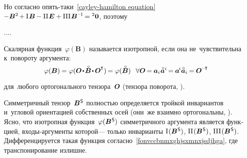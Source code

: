 \begin{otherlanguage}{russian}

Но согласно опять\hbox{-}таки~\eqref{cayley-hamilton equation}
${\hspace{-0.1ex} -\bm{B}^{2} \hspace{-0.2ex} + \mathrm{I}\hspace{.16ex} \bm{B} \hspace{-0.1ex} - \mathrm{II}\hspace{.16ex} \UnitDyad + \mathrm{III}\hspace{.16ex} \bm{B}^{\expminusone} \hspace{-0.25ex} = \zerobivalent}$,
поэтому


....


Скалярная функция~${\varphi(\bm{B})}$ называется изотропной,
если она не~чувствительна к~повороту аргумента:
\nopagebreak\vspace{.1em}\begin{equation*}
\varphi(\bm{B}) \hspace{-0.12ex} = \varphi ( \rotationtensor \narrowdotp \smash{\mathcircabove{\bm{B}}} \narrowdotp \hspace{.15ex} \rotationtensor^{\hspace{-0.1ex}\T} ) \hspace{-0.2ex} = \varphi(\smash{\mathcircabove{\bm{B}}}) \;\;\,
\forall \rotationtensor \hspace{-0.2ex} = \hspace{-0.1ex} \bm{a}_i \hspace{.1ex} \mathcircabove{\bm{a}}^i \hspace{-0.25ex} = \hspace{-0.1ex} \bm{a}^{\hspace{-0.2ex}i} \mathcircabove{\bm{a}}_i \hspace{-0.16ex} = \hspace{-0.1ex} \rotationtensor^{\hspace{-0.1ex}\expminusT}
\end{equation*}
\par\vspace{-0.25em}\noindent
для~любого ортогонального тензора~$\bm{O}$ (тензора поворота, ).

Симметричный тензор~${\bm{B}^{\mathsf{\hspace{.1ex}S}}}$ полностью определяется тройкой инвариантов и~угловой ориентацией собственных осей (они~же взаимно ортогональны, ).
Ясно, что изотропная функция~${\varphi(\bm{B}^{\mathsf{\hspace{.1ex}S}})}$ симметричного аргумента является функцией, входы-аргументы которой\:--- только инварианты
${ \mathrm{I}\hspace{.16ex}(\bm{B}^{\mathsf{\hspace{.1ex}S}}) }$,
${ \mathrm{II}\hspace{.16ex}(\bm{B}^{\mathsf{\hspace{.1ex}S}}) }$,
${ \mathrm{III}\hspace{.16ex}(\bm{B}^{\mathsf{\hspace{.1ex}S}}) }$.
Дифференцируется такая функция согласно~\eqref{fonvccbnmxghjsxmnxjsdjhga},
где транспонирование излишне.

\end{otherlanguage}

